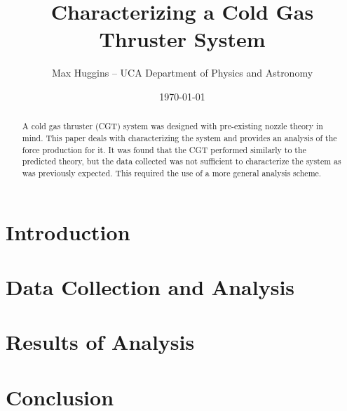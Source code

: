 \documentclass[letterpaper,12pt]{article}
\begin{document}
\title{Characterizing a Cold Gas Thruster System}
\author{Max Huggins – UCA Department of Physics and Astronomy}
\date{\today}
\maketitle


\begin{abstract}
A cold gas thruster (CGT) system was designed with pre-existing nozzle theory in mind. This paper deals with characterizing the system and provides an analysis of the force production for it. It was found that the CGT performed similarly to the predicted theory, but the data collected was not sufficient to characterize the system as was previously expected. This required the use of a more general analysis scheme.
\end{abstract}


\section{Introduction}


\section{Data Collection and Analysis}%




\section{Results of Analysis}




\section{Conclusion}





\printnomenclature\label{nomenclature}



\end{document}
